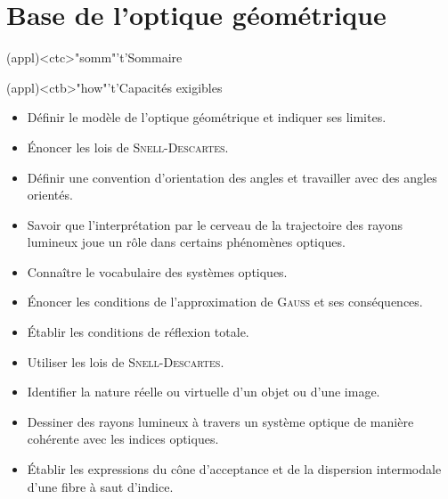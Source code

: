 \documentclass[../../main/main.tex]{subfiles}
\begin{document}
\setcounter{chapter}{1}


\chapter{Base de l'optique g\'eom\'etrique}

\vspace*{\fill}

\begin{tcn}(appl)<ctc>"somm"'t'{Sommaire}
	\let\item\olditem
	\vspace{-15pt}
	\minitoc
	\vspace{-25pt}
\end{tcn}

\begin{tcn}[sidebyside](appl)<ctb>"how"'t'{Capacités exigibles}
	\begin{itemize}[label=\rcheck]
		\item Définir le modèle de l'optique géométrique et indiquer ses limites.
		\item Énoncer les lois de \textsc{Snell-Descartes}.
		\item Définir une convention d'orientation des angles et travailler avec
		      des angles orientés.
		\item Savoir que l'interprétation par le cerveau de la trajectoire des
		      rayons lumineux joue un rôle dans certains phénomènes optiques.
		\item Connaître le vocabulaire des systèmes optiques.
	\end{itemize}
	\tcblower
	\begin{itemize}[label=\rcheck]
		\item Énoncer les conditions de l'approximation de \textsc{Gauss} et ses
		      conséquences.
		\item Établir les conditions de réflexion totale.
		\item Utiliser les lois de \textsc{Snell-Descartes}.
		\item Identifier la nature réelle ou virtuelle d'un objet ou d'une image.
		\item Dessiner des rayons lumineux à travers un système optique de manière
		      cohérente avec les indices optiques.
		\item Établir les expressions du cône d'acceptance et de la dispersion
		      intermodale d'une fibre à saut d'indice.
	\end{itemize}
\end{tcn}
\end{document}

